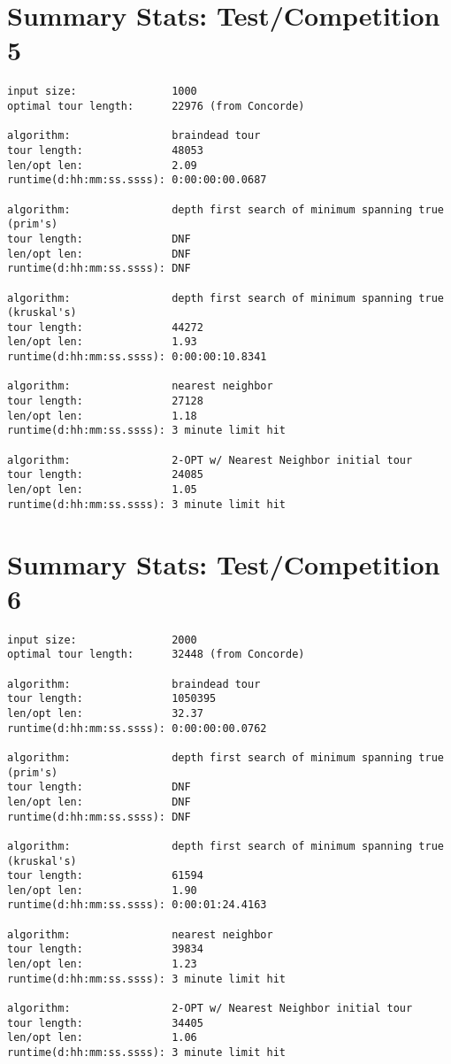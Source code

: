 \documentclass[12pt]{article}
\begin{document}
\newpage
\section*{Summary Stats: Test/Competition 5}
\begin{verbatim}
input size:               1000
optimal tour length:      22976 (from Concorde)

algorithm:                braindead tour
tour length:              48053
len/opt len:              2.09
runtime(d:hh:mm:ss.ssss): 0:00:00:00.0687

algorithm:                depth first search of minimum spanning true (prim's) 
tour length:              DNF
len/opt len:              DNF
runtime(d:hh:mm:ss.ssss): DNF 

algorithm:                depth first search of minimum spanning true (kruskal's) 
tour length:              44272
len/opt len:              1.93
runtime(d:hh:mm:ss.ssss): 0:00:00:10.8341

algorithm:                nearest neighbor 
tour length:              27128
len/opt len:              1.18
runtime(d:hh:mm:ss.ssss): 3 minute limit hit

algorithm:                2-OPT w/ Nearest Neighbor initial tour
tour length:              24085
len/opt len:              1.05
runtime(d:hh:mm:ss.ssss): 3 minute limit hit
\end{verbatim}

\newpage
\section*{Summary Stats: Test/Competition 6}
\begin{verbatim}
input size:               2000
optimal tour length:      32448 (from Concorde)

algorithm:                braindead tour
tour length:              1050395
len/opt len:              32.37
runtime(d:hh:mm:ss.ssss): 0:00:00:00.0762

algorithm:                depth first search of minimum spanning true (prim's) 
tour length:              DNF
len/opt len:              DNF
runtime(d:hh:mm:ss.ssss): DNF

algorithm:                depth first search of minimum spanning true (kruskal's) 
tour length:              61594
len/opt len:              1.90
runtime(d:hh:mm:ss.ssss): 0:00:01:24.4163

algorithm:                nearest neighbor 
tour length:              39834
len/opt len:              1.23
runtime(d:hh:mm:ss.ssss): 3 minute limit hit

algorithm:                2-OPT w/ Nearest Neighbor initial tour
tour length:              34405
len/opt len:              1.06
runtime(d:hh:mm:ss.ssss): 3 minute limit hit
\end{verbatim}
\end{document}
